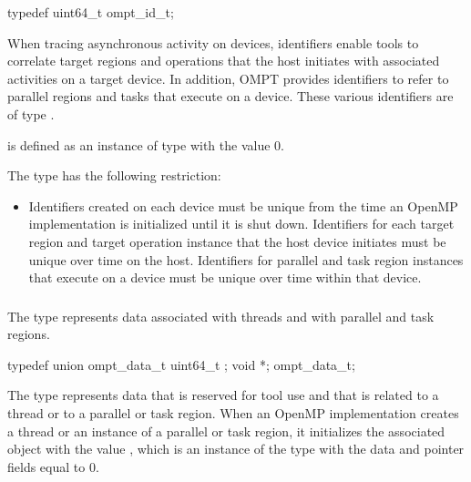 \format
\begin{ccppspecific}
\begin{omptOther}
typedef uint64_t ompt_id_t;
\end{omptOther}
\end{ccppspecific}

\descr
When tracing asynchronous activity on devices, identifiers  enable tools
to correlate target regions and operations that the host initiates with
associated activities on a target device. In addition, OMPT provides 
identifiers to refer to parallel regions and tasks that execute on a device.
These various identifiers are of type .

 is defined as an instance of type  
with the value 0.

\restrictions
The  type has the following restriction:

\begin{itemize}
\item Identifiers created on each device must be unique from the time an OpenMP 
      implementation is initialized until it is shut down. Identifiers for each 
      target region and target operation instance that the host device initiates
      must be unique over time on the host. Identifiers for parallel and task 
      region instances that execute on a device must be unique over time within 
      that device.
\end{itemize}



\subsubsection{}
\label{sec:ompt_data_t}

\summary
The  type represents data associated with threads and 
with parallel and task regions.

\format
\begin{ccppspecific}
\begin{omptOther}
typedef union ompt_data_t {
  uint64_t ;
  void *;
} ompt_data_t;
\end{omptOther}
\end{ccppspecific}

\descr
The  type represents data that is reserved for tool use and
that is related to a thread or to a parallel or task region. When an OpenMP 
implementation creates a thread or an instance of a parallel or task region, 
it initializes the associated  object with the value 
, which is an instance of the type with the data and 
pointer fields equal to 0.



